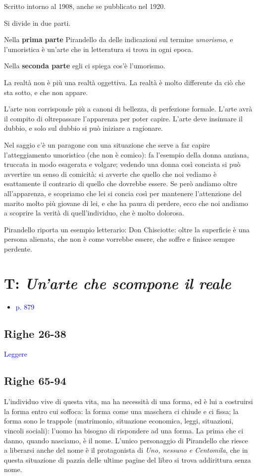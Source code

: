 \documentclass[a4paper, twoside, titlepage]{book}
\newcommand{\elenco}[1]{%
\begin{itemize}
#1
\end{itemize}}
\renewcommand{\emph}[1]{\textcolor{blue}{#1}}
\begin{document}
Scritto intorno al 1908, anche se pubblicato nel 1920.

Si divide in due parti.

Nella \textbf{prima parte} Pirandello da delle indicazioni sul termine \textit{umorismo}, e l'umoristica è un'arte che in letteratura si trova in ogni epoca.

Nella \textbf{seconda parte} egli ci spiega cos'è l'umorismo.

La realtà non è più una realtà oggettiva. La realtà è molto differente da ciò che sta sotto, e che non appare.

L'arte non corrisponde più a canoni di bellezza, di perfezione formale. L'arte avrà il compito di oltrepassare l'apparenza per poter capire. L'arte deve insinuare il dubbio, e solo sul dubbio si può iniziare a ragionare.

Nel saggio c'è un paragone con una situazione che serve a far capire l'atteggiamento umoristico (che non è comico): fa l'esempio della donna anziana, truccata in modo esagerata e volgare; vedendo una donna così conciata si può avvertire un senso di comicità: si avverte che quello che noi vediamo è esattamente il contrario di quello che dovrebbe essere. Se però andiamo oltre all'apparenza, e scopriamo che lei si concia così per mantenere l'attenzione del marito molto più giovane di lei, e che ha paura di perdere, ecco che noi andiamo a scoprire la verità di quell'individuo, che è molto dolorosa.

Pirandello riporta un esempio letterario: Don Chisciotte: oltre la superficie è una persona alienata, che non è come vorrebbe essere, che soffre e finisce sempre perdente.

\section{T: \textit{Un'arte che scompone il reale}}
\elenco{\item \emph{p. 879}}

\subsection*{Righe 26-38}

\emph{Leggere}

\subsection*{Righe 65-94}

L'individuo vive di questa vita, ma ha necessità di una forma, ed è lui a costruirsi la forma entro cui soffoca: la forma come una maschera ci chiude e ci fissa; la forma sono le trappole (matrimonio, situazione economica, leggi, situazioni, vincoli sociali): l'uomo ha bisogno di rispondere ad una forma.
La prima che ci danno, quando nasciamo, è il nome. L'unico personaggio di Pirandello che riesce a liberarsi anche del nome è il protagonista di \textit{Uno, nessuno e Centomila}, che in questa situazione di pazzia delle ultime pagine del libro si trova addirittura senza nome.
\end{document}
